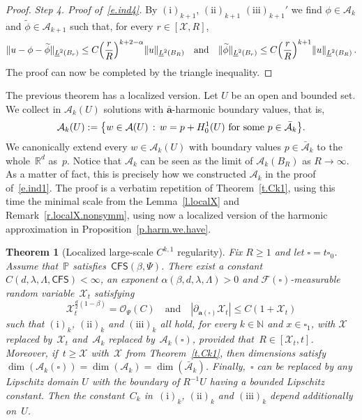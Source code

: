 \documentclass[11pt]{article} %
\let\oldsquare\square %
\renewcommand{\square}{\oldsquare}
\numberwithin{equation}{section}
\newtheorem{theorem}{Theorem}[section]
\theoremstyle{definition}
\let\originalleft\left
\let\originalright\right
\renewcommand{\left}{\mathopen{}\mathclose\bgroup\originalleft}
\renewcommand{\right}{\aftergroup\egroup\originalright}
\newcommand*{\N}{\ensuremath{\mathbb{N}}}
\newcommand*{\R}{\ensuremath{\mathbb{R}}}
\renewcommand*{\tilde}{\widetilde}
\newcommand{\qand}{\quad \mbox{and} \quad }
\renewcommand{\a}{\mathbf{a}}
\newcommand{\ahom}{\bar{\a}}
\newcommand{\cu}{\square}
\newcommand{\F}{\mathcal{F}}
\renewcommand{\P}{\mathbb{P}}
\newcommand{\X}{\mathcal{X}}
\renewcommand{\O}{\mathcal{O}}
\newcommand{\CFS}{\mathsf{CFS}}
\newcommand{\A}{\mathcal{A}}
\newcommand{\Ahom}{\bar{\A}}
\begin{document}
\begin{proof}
\smallskip

\emph{Step 4. Proof of~\eqref{e.ind4}.} By $\mathrm{(i)}_{k+1}$, $\mathrm{(ii)}_{k+1}$ $\mathrm{(iii)}_{k+1}'$ we find $\phi \in \A_k$ and $\tilde \phi \in \A_{k+1}$ such that, for every $r \in [\X,R]$, 
\begin{align*}  
\| u - \phi - \tilde \phi \|_{\underline{L}^2(B_{r})} 
\leq 
C 
\Bigl( \frac{r}{R} \Bigr)^{k+2-\alpha} 
\| u \|_{\underline{L}^2(B_{R})} 
\quad \mbox{and} \quad 
\| \tilde \phi \|_{\underline{L}^2(B_{r})} 
\leq 
C \left( \frac{r}{R} \right)^{k+1} 
\| u \|_{\underline{L}^2(B_{R})} 
\,.
\end{align*}
The proof can now be completed by the triangle inequality. 
\end{proof}

The previous theorem has a localized version. Let $U$ be an open and bounded set.  We collect in $\A_k (U)$ solutions with $\ahom$-harmonic boundary values, that is, 
\begin{equation}
\label{e.localAk}
\A_k (U) := \left\{ w \in \A(U) \, : \, w = p + H_0^1(U)  \mbox{ for some } p\in \Ahom_k \right\}.
\end{equation}
We canonically extend every $w\in \A_k (U)$ with boundary values $p\in \Ahom_k$ to the whole~$\R^d$ as~$p$. 
Notice that $\A_k$ can be seen as the limit of $\A_k (B_R)$ as $R\to \infty$. As a matter of fact, this is precisely how we constructed $\A_k$ in the proof of~\eqref{e.ind1}. The proof is a verbatim repetition of Theorem~\ref{t.Ck1}, using this time the minimal scale from the Lemma~\ref{l.localX} and Remark~\ref{r.localX.nonsymm}, using now a localized version of the harmonic approximation in Proposition~\ref{p.harm.we.have}. 



\begin{theorem}[{Localized large-scale $C^{k,1}$ regularity}]
\label{t.Ck1.local}
Fix $R \geq 1$ and let $\cu = t \cu_0$. Assume that~$\P$ satisfies~$\CFS(\beta,\Psi)$. 
There exist a constant~$C(d,\lambda,\Lambda,\CFS)<\infty$, an exponent $\alpha(\beta,d,\lambda,\Lambda)>0$ and $\F(\cu)$-measurable random variable~$\X_t$ satisfying
\begin{equation}
\label{e.X.local}
\X_t^{\frac d2(1-\beta)  } 
= 
\O_{\Psi}(C) 
\qand 
|\partial_{\a(\cu)} \X_t |
\leq C(1+\X_t) 
\end{equation}
such that $\mathrm{(i)}_k$, $\mathrm{(ii)}_k$ and $\mathrm{(iii)}_k$ all hold, for every $k\in\N$ and $x \in \cu_1$, with $\X$ replaced by~$\X_t$ and~$\A_k$ replaced by~$\A_k (\cu)$, provided that~$R \in [\X_t,t]$. Moreover, if~$t \geq \X$ with~$\X$ from Theorem~\ref{t.Ck1}, then dimensions satisfy $\dim(\A_k(\cu)) = \dim(\A_k)  = \dim(\Ahom_k)$. Finally,~$\cu$ can be replaced by any Lipschitz domain $U$ with the boundary of $R^{-1} U$ having a bounded Lipschitz constant. Then the constant~$C_k$ in~$\mathrm{(i)}_k$, $\mathrm{(ii)}_k$ and $\mathrm{(iii)}_k$ depend additionally on~$U$. 
\end{theorem}
\end{document}
